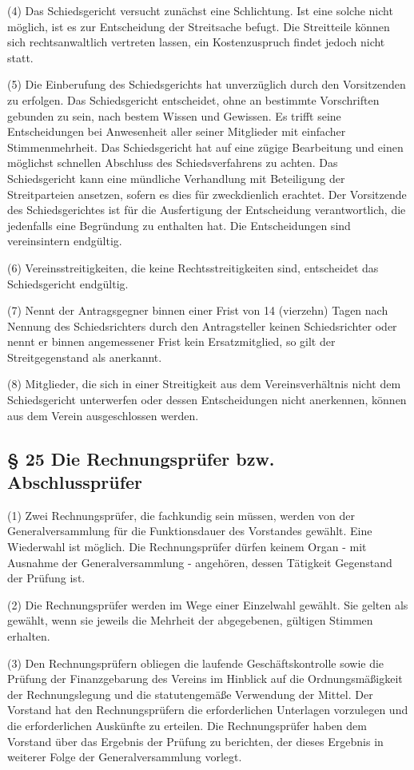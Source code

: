 \documentclass[11pt,a4paper]{article}
\begin{document}
(4)
Das Schiedsgericht versucht zunächst eine Schlichtung.
Ist eine solche nicht möglich, ist es zur Entscheidung der Streitsache befugt.
Die Streitteile können sich rechtsanwaltlich vertreten lassen, ein Kostenzuspruch findet jedoch nicht statt.

(5)
Die Einberufung des Schiedsgerichts hat unverzüglich durch den Vorsitzenden zu erfolgen.
Das Schiedsgericht entscheidet, ohne an bestimmte Vorschriften gebunden zu sein, nach bestem Wissen und Gewissen.
Es trifft seine Entscheidungen bei Anwesenheit aller seiner Mitglieder mit einfacher Stimmenmehrheit.
Das Schiedsgericht hat auf eine zügige Bearbeitung und einen möglichst schnellen Abschluss des Schiedsverfahrens zu achten.
Das Schiedsgericht kann eine mündliche Verhandlung mit Beteiligung der Streitparteien ansetzen, sofern es dies für zweckdienlich erachtet.
Der Vorsitzende des Schiedsgerichtes ist für die Ausfertigung der Entscheidung verantwortlich, die jedenfalls eine Begründung zu enthalten hat.
Die Entscheidungen sind vereinsintern endgültig.

(6)
Vereinsstreitigkeiten, die keine Rechtsstreitigkeiten sind, entscheidet das Schiedsgericht endgültig.

(7)
Nennt der Antragsgegner binnen einer Frist von 14 (vierzehn) Tagen nach Nennung des Schiedsrichters durch den Antragsteller keinen Schiedsrichter oder nennt er binnen angemessener Frist kein Ersatzmitglied, so gilt der Streitgegenstand als anerkannt.

(8)
Mitglieder, die sich in einer Streitigkeit aus dem Vereinsverhältnis nicht dem Schiedsgericht unterwerfen oder dessen Entscheidungen nicht anerkennen, können aus dem Verein ausgeschlossen werden.

\subsection{§ 25
Die Rechnungsprüfer bzw. Abschlussprüfer}

(1)
Zwei Rechnungsprüfer, die fachkundig sein müssen, werden von der Generalversammlung für die Funktionsdauer des Vorstandes gewählt.
Eine Wiederwahl ist möglich.
Die Rechnungsprüfer dürfen keinem Organ - mit Ausnahme der Generalversammlung - angehören, dessen Tätigkeit Gegenstand der Prüfung ist.

(2)
Die Rechnungsprüfer werden im Wege einer Einzelwahl gewählt.
Sie gelten als gewählt, wenn sie jeweils die Mehrheit der abgegebenen, gültigen Stimmen erhalten.

(3)
Den Rechnungsprüfern obliegen die laufende Geschäftskontrolle sowie die Prüfung der Finanzgebarung des Vereins im Hinblick auf die Ordnungsmäßigkeit der Rechnungslegung und die statutengemäße Verwendung der Mittel.
Der Vorstand hat den Rechnungsprüfern die erforderlichen Unterlagen vorzulegen und die erforderlichen Auskünfte zu erteilen.
Die Rechnungsprüfer haben dem Vorstand über das Ergebnis der Prüfung zu berichten, der dieses Ergebnis in weiterer Folge der Generalversammlung vorlegt.
\end{document}
